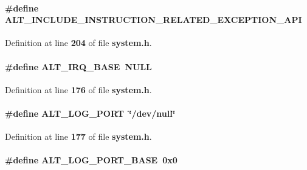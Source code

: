 \paragraph[{A\+L\+T\+\_\+\+I\+N\+C\+L\+U\+D\+E\+\_\+\+I\+N\+S\+T\+R\+U\+C\+T\+I\+O\+N\+\_\+\+R\+E\+L\+A\+T\+E\+D\+\_\+\+E\+X\+C\+E\+P\+T\+I\+O\+N\+\_\+\+A\+PI}]{\setlength{\rightskip}{0pt plus 5cm}\#define A\+L\+T\+\_\+\+I\+N\+C\+L\+U\+D\+E\+\_\+\+I\+N\+S\+T\+R\+U\+C\+T\+I\+O\+N\+\_\+\+R\+E\+L\+A\+T\+E\+D\+\_\+\+E\+X\+C\+E\+P\+T\+I\+O\+N\+\_\+\+A\+PI}\label{system_8h_a9ca787fc2b90a6fda446855894cf4cc9}


Definition at line {\bf 204} of file {\bf system.\+h}.

\paragraph[{A\+L\+T\+\_\+\+I\+R\+Q\+\_\+\+B\+A\+SE}]{\setlength{\rightskip}{0pt plus 5cm}\#define A\+L\+T\+\_\+\+I\+R\+Q\+\_\+\+B\+A\+SE~N\+U\+LL}\label{system_8h_ab3477fa49b6fdd5ff3b903581690db6f}


Definition at line {\bf 176} of file {\bf system.\+h}.

\paragraph[{A\+L\+T\+\_\+\+L\+O\+G\+\_\+\+P\+O\+RT}]{\setlength{\rightskip}{0pt plus 5cm}\#define A\+L\+T\+\_\+\+L\+O\+G\+\_\+\+P\+O\+RT~\char`\"{}/dev/null\char`\"{}}\label{system_8h_af93112a118ce4301ca44e998ae502803}


Definition at line {\bf 177} of file {\bf system.\+h}.

\paragraph[{A\+L\+T\+\_\+\+L\+O\+G\+\_\+\+P\+O\+R\+T\+\_\+\+B\+A\+SE}]{\setlength{\rightskip}{0pt plus 5cm}\#define A\+L\+T\+\_\+\+L\+O\+G\+\_\+\+P\+O\+R\+T\+\_\+\+B\+A\+SE~0x0}\label{system_8h_aba027bbc1844fc8dcc42feecfd78292e}


